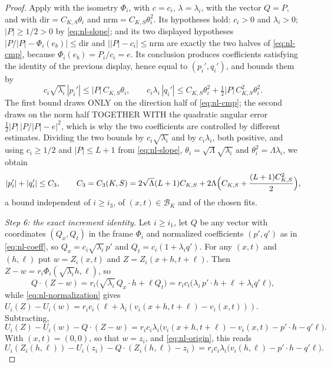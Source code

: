 \begin{proof}
Apply  with the isometry $\Phi_i$, with
$c=c_i$, $\lambda=\lambda_i$, with the vector $Q=P$, and with
$\mathrm{dir}=C_{K,S}\theta_i$ and $\mathrm{nrm}=C_{K,S}\theta_i^2$. Its hypotheses
hold: $c_i>0$ and $\lambda_i>0$; $|P|\ge1/2>0$ by \eqref{eq:nl-slope}; and its two
displayed hypotheses $\bigl|P/|P|-\Phi_i(e_b)\bigr|\le\mathrm{dir}$ and
$\bigl||P|-c_i\bigr|\le\mathrm{nrm}$ are exactly the two halves of
\eqref{eq:nl-cmp}, because $\Phi_i(e_b)=P_i/c_i=e$. Its conclusion produces
coefficients satisfying the identity of the previous display, hence equal to
$(p_i',q_i')$, and bounds them by
\[
  c_i\sqrt{\lambda_i}\,|p_i'|\le|P|\,C_{K,S}\theta_i,
  \qquad
  c_i\lambda_i\,|q_i'|\le C_{K,S}\theta_i^2
     +\tfrac12|P|\,C_{K,S}^2\theta_i^2 .
\]
The first bound draws ONLY on the direction half of \eqref{eq:nl-cmp}; the second
draws on the norm half TOGETHER WITH the quadratic angular error
$\tfrac12|P|\,\bigl|P/|P|-e\bigr|^2$, which is why the two coefficients are
controlled by different estimates. Dividing the two bounds by $c_i\sqrt{\lambda_i}$
and by $c_i\lambda_i$, both positive, and using $c_i\ge1/2$ and $|P|\le L+1$ from
\eqref{eq:nl-slope}, $\theta_i=\sqrt\Lambda\sqrt{\lambda_i}$ and
$\theta_i^2=\Lambda\lambda_i$, we obtain
\begin{equation}\label{eq:nl-coeff-bound}
  |p_i'|+|q_i'|\le C_3,\qquad
  C_3=C_3(K,S)=2\sqrt\Lambda(L+1)C_{K,S}
      +2\Lambda\Bigl(C_{K,S}+\frac{(L+1)C_{K,S}^2}2\Bigr),
\end{equation}
a bound independent of $i\ge i_3$, of $(x,t)\in\mathcal B_K$ and of the chosen
fits.

\emph{Step 6: the exact increment identity.}
Let $i\ge i_1$, let $Q$ be any vector with coordinates $(Q_x,Q_t)$ in the frame
$\Phi_i$ and normalized coefficients $(p',q')$ as in \eqref{eq:nl-coeff}, so
$Q_x=c_i\sqrt{\lambda_i}\,p'$ and $Q_t=c_i(1+\lambda_iq')$. For any
$(x,t)$ and $(h,\ell)$ put $w=Z_i(x,t)$ and $Z=Z_i(x+h,t+\ell)$. Then
$Z-w=r_i\Phi_i(\sqrt{\lambda_i}h,\ell)$, so
\[
  Q\cdot(Z-w)=r_i\bigl(\sqrt{\lambda_i}\,Q_x\cdot h+\ell Q_t\bigr)
    =r_ic_i\bigl(\lambda_i\,p'\cdot h+\ell+\lambda_iq'\ell\bigr),
\]
while \eqref{eq:nl-normalization} gives
$U_i(Z)-U_i(w)=r_ic_i(\ell+\lambda_i(v_i(x+h,t+\ell)-v_i(x,t)))$. Subtracting,
\begin{equation}\label{eq:nl-increment}
  U_i(Z)-U_i(w)-Q\cdot(Z-w)
   =r_ic_i\lambda_i\bigl(v_i(x+h,t+\ell)-v_i(x,t)-p'\cdot h-q'\ell\bigr).
\end{equation}
With $(x,t)=(0,0)$, so that $w=z_i$, and \eqref{eq:nl-origin}, this reads
\begin{equation}\label{eq:nl-increment-base}
  U_i(Z_i(h,\ell))-U_i(z_i)-Q\cdot(Z_i(h,\ell)-z_i)
   =r_ic_i\lambda_i\bigl(v_i(h,\ell)-p'\cdot h-q'\ell\bigr).
\end{equation}


\end{proof}
